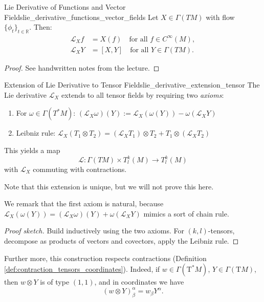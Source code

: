 \begin{colortheo}{Lie Derivative of Functions and Vector Fields}{lie_derivative_functions_vector_fields}
Let $X \in \Gamma(TM)$ with flow $\{\phi_t\}_{t \in \mathbb{R}}$. Then:
\begin{align*}
\mathcal{L}_X f &= X(f) \quad \text{for all } f \in C^\infty(M), \\
\mathcal{L}_X Y &= [X, Y] \quad \text{for all } Y \in \Gamma(TM).
\end{align*}
\end{colortheo}

\begin{proof}
    See handwritten notes from the lecture.
\end{proof}



\begin{colorlem}{Extension of Lie Derivative to Tensor Fields}{lie_derivative_extension_tensor}
The Lie derivative $\mathcal{L}_X$ extends to all tensor fields by requiring two \emph{axioms}:
\begin{enumerate}
    \item For $\omega \in \Gamma(T^*M)$: $(\mathcal{L}_X \omega)(Y) := \mathcal{L}_X(\omega(Y)) - \omega(\mathcal{L}_X Y)$
    \item Leibniz rule: $\mathcal{L}_X(T_1 \otimes T_2) = (\mathcal{L}_X T_1) \otimes T_2 + T_1 \otimes (\mathcal{L}_X T_2)$
\end{enumerate}

This yields a map
\[
\mathcal{L}: \Gamma(TM)\times T^k_l(M) \longrightarrow T^k_l(M)
\]
with $\mathcal{L}_X$ commuting with contractions.
\end{colorlem}

Note that this extension is unique, but we will not prove this here.

We remark that the first axiom is natural, because $\mathcal{L}_X(\omega(Y)) = (\mathcal{L}_X \omega)(Y) + \omega(\mathcal{L}_X Y)$ mimics a sort of chain rule.


\begin{proof}[Proof sketch]
Build inductively using the two axioms. For $(k,l)$-tensors, decompose as products of vectors and covectors, apply the Leibniz rule.
\end{proof}


Further more, this construction respects contractions (Definition \ref{def:contraction_tensors_coordinates}). Indeed, if $w \in \Gamma(\mathrm{T}^*M)$, $Y \in \Gamma(\mathrm{T}M)$, then $w \otimes Y$ is of type $(1,1)$, and in coordinates we have
$$
(w \otimes Y)^\alpha_\beta = w_\beta Y^\alpha.
$$

